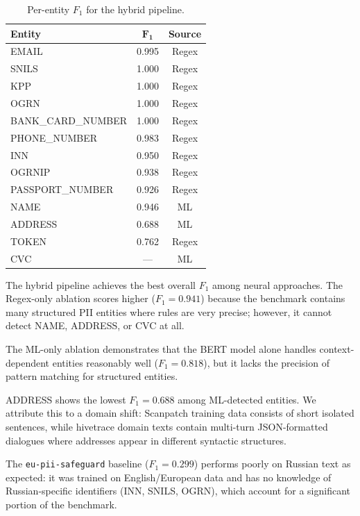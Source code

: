 \documentclass{article}
\begin{document}
\begin{table}[tbh!]
\begin{center}
\begin{tabular}[t]{|l|cc|}
\hline
\textbf{Entity} & $\mathbf{F_1}$ & \textbf{Source} \\
\hline
EMAIL & 0.995 & Regex \\
SNILS & 1.000 & Regex \\
KPP & 1.000 & Regex \\
OGRN & 1.000 & Regex \\
BANK\_CARD\_NUMBER & 1.000 & Regex \\
PHONE\_NUMBER & 0.983 & Regex \\
INN & 0.950 & Regex \\
OGRNIP & 0.938 & Regex \\
PASSPORT\_NUMBER & 0.926 & Regex \\
NAME & 0.946 & ML \\
ADDRESS & 0.688 & ML \\
TOKEN & 0.762 & Regex \\
CVC & --- & ML \\
\hline
\end{tabular}
\caption{Per-entity $F_1$ for the hybrid pipeline.}
\label{tab:perlabel}
\end{center}
\end{table}

The hybrid pipeline achieves the best overall $F_1$ among neural approaches. The Regex-only ablation scores higher ($F_1 = 0.941$) because the benchmark contains many structured PII entities where rules are very precise; however, it cannot detect NAME, ADDRESS, or CVC at all.

The ML-only ablation demonstrates that the BERT model alone handles context-dependent entities reasonably well ($F_1 = 0.818$), but it lacks the precision of pattern matching for structured entities.

ADDRESS shows the lowest $F_1 = 0.688$ among ML-detected entities. We attribute this to a domain shift: Scanpatch training data consists of short isolated sentences, while hivetrace domain texts contain multi-turn JSON-formatted dialogues where addresses appear in different syntactic structures.

The \texttt{eu-pii-safeguard} baseline ($F_1 = 0.299$) performs poorly on Russian text as expected: it was trained on English/European data and has no knowledge of Russian-specific identifiers (INN, SNILS, OGRN), which account for a significant portion of the benchmark.
\end{document}
